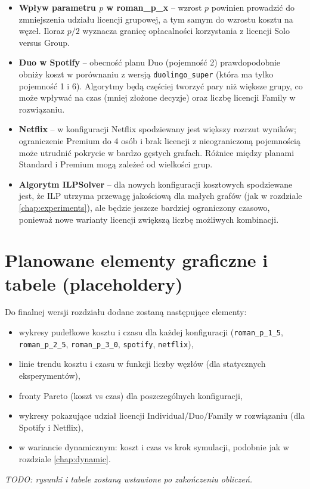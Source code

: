 \begin{itemize}
\item \textbf{Wpływ parametru $p$ w roman\_p\_x} -- wzrost $p$ powinien prowadzić do zmniejszenia udziału licencji grupowej, a tym samym do wzrostu kosztu na węzeł. Iloraz $p/2$ wyznacza granicę opłacalności korzystania z licencji Solo versus Group.

\item \textbf{Duo w Spotify} -- obecność planu Duo (pojemność 2) prawdopodobnie obniży koszt w porównaniu z wersją \texttt{duolingo\_super} (która ma tylko pojemność 1 i 6). Algorytmy będą częściej tworzyć pary niż większe grupy, co może wpływać na czas (mniej złożone decyzje) oraz liczbę licencji Family w rozwiązaniu.

\item \textbf{Netflix} -- w konfiguracji Netflix spodziewany jest większy rozrzut wyników; ograniczenie Premium do 4 osób i brak licencji z nieograniczoną pojemnością może utrudnić pokrycie w bardzo gęstych grafach. Różnice między planami Standard i Premium mogą zależeć od wielkości grup.

\item \textbf{Algorytm ILPSolver} -- dla nowych konfiguracji kosztowych spodziewane jest, że ILP utrzyma przewagę jakościową dla małych grafów (jak w rozdziale \ref{chap:experiments}), ale będzie jeszcze bardziej ograniczony czasowo, ponieważ nowe warianty licencji zwiększą liczbę możliwych kombinacji.
\end{itemize}

\section{Planowane elementy graficzne i tabele (placeholdery)}

Do finalnej wersji rozdziału dodane zostaną następujące elementy:

\begin{itemize}
\item wykresy pudełkowe kosztu i czasu dla każdej konfiguracji (\texttt{roman\_p\_1\_5}, \texttt{roman\_p\_2\_5}, \texttt{roman\_p\_3\_0}, \texttt{spotify}, \texttt{netflix}),
\item linie trendu kosztu i czasu w funkcji liczby węzłów (dla statycznych eksperymentów),
\item fronty Pareto (koszt vs czas) dla poszczególnych konfiguracji,
\item wykresy pokazujące udział licencji Individual/Duo/Family w rozwiązaniu (dla Spotify i Netflix),
\item w wariancie dynamicznym: koszt i czas vs krok symulacji, podobnie jak w rozdziale \ref{chap:dynamic}.
\end{itemize}

\emph{TODO: rysunki i tabele zostaną wstawione po zakończeniu obliczeń.}
